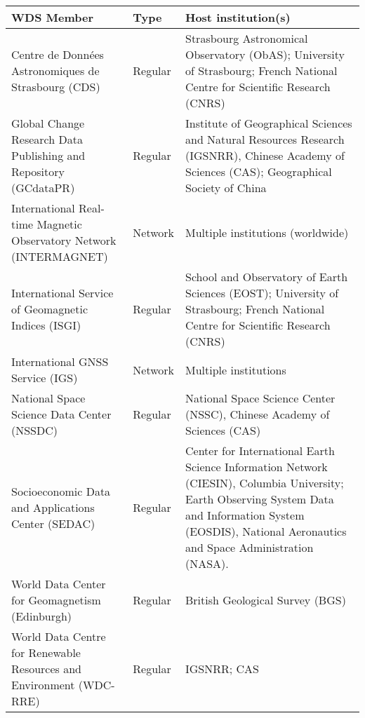 \documentclass{interact}
\begin{document}
\begin{table}
{\renewcommand{\arraystretch}{1.5}{\begin{tabular}{p{0.35\linewidth} p{0.1\linewidth} p{0.55\linewidth}}\\\hline
WDS Member & Type & Host institution(s)\\
\hline
Centre de Donn\'ees Astronomiques de Strasbourg (CDS) & Regular & Strasbourg Astronomical Observatory (ObAS); University of Strasbourg; French National Centre for Scientific Research (CNRS)\\
Global Change Research Data Publishing and Repository (GCdataPR) & Regular &Institute of Geographical Sciences and Natural Resources Research (IGSNRR), Chinese Academy of Sciences (CAS); Geographical Society of China\\
International Real-time Magnetic Observatory Network (INTERMAGNET) & Network & Multiple institutions (worldwide)\\
International Service of Geomagnetic Indices (ISGI) & Regular & School and Observatory of Earth Sciences (EOST); University of Strasbourg; French National Centre for Scientific Research (CNRS)\\
International GNSS Service (IGS) & Network & Multiple institutions\\
National Space Science Data Center (NSSDC) & Regular & National Space Science Center (NSSC), Chinese Academy of Sciences (CAS)\\
Socioeconomic Data and Applications Center (SEDAC) & Regular & Center for International Earth Science Information Network (CIESIN), Columbia University; Earth Observing System Data and Information System (EOSDIS), National Aeronautics and Space Administration (NASA).\\
World Data Center for Geomagnetism (Edinburgh) & Regular & British Geological Survey (BGS)\\
World Data Centre for Renewable Resources and Environment (WDC-RRE) & Regular & IGSNRR; CAS\\ \bottomrule
\end{tabular}}}
\label{table-institutions}
\end{table}
\end{document}
